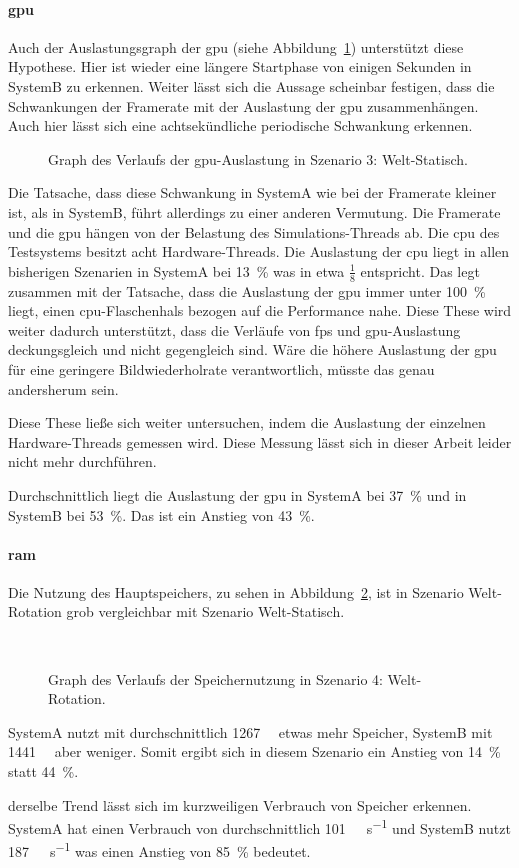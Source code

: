 \paragraph{\ac{gpu}}
Auch der Auslastungsgraph der \ac{gpu} (siehe Abbildung~\ref{fig:seed-0-rotate-gpu}) unterstützt diese Hypothese. Hier ist wieder eine längere Startphase von einigen Sekunden in SystemB zu erkennen. Weiter lässt sich die Aussage scheinbar festigen, dass die Schwankungen der Framerate mit der Auslastung der \ac{gpu} zusammenhängen. Auch hier lässt sich eine achtsekündliche periodische Schwankung erkennen.
\begin{figure}[!htbp]
	\caption[Graph des Verlaufs der -Auslastung in Szenario 4: Welt-Rotation.]{Graph des Verlaufs der \ac{gpu}-Auslastung in Szenario 3: Welt-Statisch.}\label{fig:seed-0-rotate-gpu}
\end{figure}
Die Tatsache, dass diese Schwankung in SystemA wie bei der Framerate kleiner ist, als in SystemB, führt allerdings zu einer anderen Vermutung. Die Framerate und die \ac{gpu} hängen von der Belastung des Simulations-Threads ab. Die \ac{cpu} des Testsystems besitzt acht Hardware-Threads. Die Auslastung der \ac{cpu} liegt in allen bisherigen Szenarien in SystemA bei \SI{13}{\percent} was in etwa $\frac{1}{8}$ entspricht. Das legt zusammen mit der Tatsache, dass die Auslastung der \ac{gpu} immer unter \SI{100}{\percent} liegt, einen \ac{cpu}-Flaschenhals bezogen auf die Performance nahe. Diese These wird weiter dadurch unterstützt, dass die Verläufe von \ac{fps} und \ac{gpu}-Auslastung deckungsgleich und nicht gegengleich sind. Wäre die höhere Auslastung der \ac{gpu} für eine geringere Bildwiederholrate verantwortlich, müsste das genau andersherum sein.

Diese These ließe sich weiter untersuchen, indem die Auslastung der einzelnen Hardware-Threads gemessen wird. Diese Messung lässt sich in dieser Arbeit leider nicht mehr durchführen. 

Durchschnittlich liegt die Auslastung der \ac{gpu} in SystemA bei \SI{37}{\percent} und in SystemB bei \SI{53}{\percent}. Das ist ein Anstieg von \SI{43}{\percent}.

\paragraph{\ac{ram}}
Die Nutzung des Hauptspeichers, zu sehen in Abbildung~\ref{fig:seed-0-rotate-mem}, ist in Szenario Welt-Rotation grob vergleichbar mit Szenario Welt-Statisch.
\begin{figure}[!htbp]
	\\
	\caption{Graph des Verlaufs der Speichernutzung in Szenario 4: Welt-Rotation.}\label{fig:seed-0-rotate-mem}	
\end{figure} 
SystemA nutzt mit durchschnittlich \SI{1267}{\mega\byte} etwas mehr Speicher, SystemB mit \SI{1441}{\mega\byte} aber weniger. Somit ergibt sich in diesem Szenario ein Anstieg von \SI{14}{\percent} statt \SI{44}{\percent}. 

derselbe Trend lässt sich im kurzweiligen Verbrauch von Speicher erkennen. SystemA hat einen Verbrauch von durchschnittlich \SI{101}{\mega\byte\per\second} und SystemB nutzt \SI{187}{\mega\byte\per\second} was einen Anstieg von \SI{85}{\percent} bedeutet.
